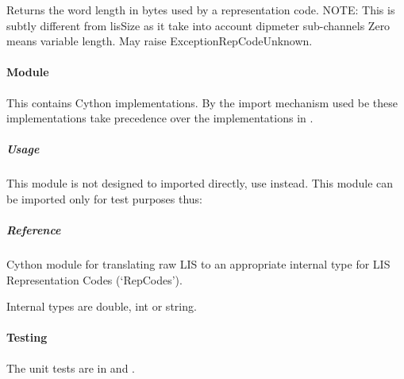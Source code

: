 \documentclass[letterpaper,10pt,english]{sphinxmanual}
\begin{document}

\begin{fulllineitems}
\label{\detokenize{ref/LIS/core/RepCode:TotalDepth.LIS.core.pRepCode.wordLength}}
Returns the word length in bytes used by a representation code.
NOTE: This is subtly different from lisSize as it take into account dipmeter
sub-channels
Zero means variable length. May raise ExceptionRepCodeUnknown.

\end{fulllineitems}



\paragraph{ Module}
\label{\detokenize{ref/LIS/core/RepCode:crepcode-module}}
This contains Cython implementations. By the import mechanism used be  these implementations take precedence over the implementations in .


\subparagraph{Usage}
\label{\detokenize{ref/LIS/core/RepCode:id3}}
This module is not designed to imported directly, use  instead. This module can be imported only for test purposes thus:

\begin{sphinxVerbatim}[commandchars=\\\{\}]
   
\end{sphinxVerbatim}


\subparagraph{Reference}
\label{\detokenize{ref/LIS/core/RepCode:id4}}\label{\detokenize{ref/LIS/core/RepCode:module-TotalDepth.LIS.core.cRepCode}}
Cython module for translating raw LIS to an appropriate internal type for LIS
Representation Codes (‘RepCodes’).

Internal types are double, int or string.


\paragraph{Testing}
\label{\detokenize{ref/LIS/core/RepCode:testing}}
The unit tests are in  and .
\end{document}
